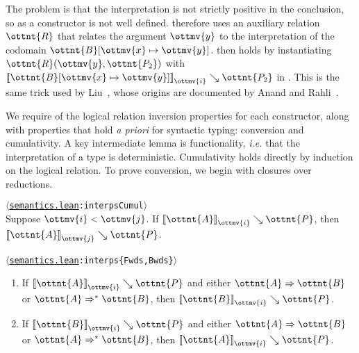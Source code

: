 \documentclass[a4paper,UKenglish,cleveref,autoref,thm-restate]{lipics-v2021}
\makeatletter
\newcommand{\citep}[1]{\cite{#1}}
\newcommand{\repo}{https://github.com/ionathanch/TTBFL}
\newcommand{\ie}{\textit{i.e.}\@\xspace}
\newcommand{\apriori}{\textit{a priori}\@\xspace}
\newcommand{\thmref}[2]{%
  $\langle$\href{\repo/tree/main/src/#1}{\texttt{#1}}\texttt{:#2}$\rangle$%
}
\makeatother
\begin{document}
The problem is that the interpretation is not strictly positive in the conclusion,
so  as a constructor is not well defined.
 therefore uses an auxiliary relation $\ottnt{R}$
that relates the argument $\ottmv{y}$ to the interpretation of the codomain $ \ottnt{B} [  \ottmv{x}  \mapsto  \ottmv{y}  ] $.
 then holds by instantiating $ \ottnt{R} ( \ottmv{y} ,  \ottnt{P_{{\mathrm{2}}}} ) $ with $ \mathopen{\llbracket}   \ottnt{B} [  \ottmv{x}  \mapsto  \ottmv{y}  ]   \mathclose{\rrbracket}_{ \ottmv{i} } \searrow  \ottnt{P_{{\mathrm{2}}}} $ in .
This is the same trick used by Liu~\citep{lr-pearl},
whose origins are documented by Anand and Rahli~\citep{mech-nuprl}.

We require of the logical relation inversion properties for each constructor,
along with properties that hold \apriori for syntactic typing:
conversion and cumulativity.
A key intermediate lemma is functionality,
\ie that the interpretation of a type is deterministic.
Cumulativity holds directly by induction on the logical relation.
To prove conversion, we begin with closures over reductions.

\begin{lemma}[Cumulativity (l.r.)] \thmref{semantics.lean}{interpsCumul} \label{lem:lr:cumul} \\
  Suppose $ \ottmv{i}  <  \ottmv{j} $. If $ \mathopen{\llbracket}  \ottnt{A}  \mathclose{\rrbracket}_{ \ottmv{i} } \searrow  \ottnt{P} $, then $ \mathopen{\llbracket}  \ottnt{A}  \mathclose{\rrbracket}_{ \ottmv{j} } \searrow  \ottnt{P} $.
\end{lemma}

\begin{lemma} \thmref{semantics.lean}{interps\{Fwds,Bwds\}} \label{lem:lr:pars} ~
  \begin{enumerate}[topsep=0pt]
    \item If $ \mathopen{\llbracket}  \ottnt{A}  \mathclose{\rrbracket}_{ \ottmv{i} } \searrow  \ottnt{P} $ and either $ \ottnt{A}  \Rightarrow  \ottnt{B} $ or $ \ottnt{A}  \Rightarrow^\ast  \ottnt{B} $,
      then $ \mathopen{\llbracket}  \ottnt{B}  \mathclose{\rrbracket}_{ \ottmv{i} } \searrow  \ottnt{P} $.
    \item If $ \mathopen{\llbracket}  \ottnt{B}  \mathclose{\rrbracket}_{ \ottmv{i} } \searrow  \ottnt{P} $ and either $ \ottnt{A}  \Rightarrow  \ottnt{B} $ or $ \ottnt{A}  \Rightarrow^\ast  \ottnt{B} $,
      then $ \mathopen{\llbracket}  \ottnt{A}  \mathclose{\rrbracket}_{ \ottmv{i} } \searrow  \ottnt{P} $.
  \end{enumerate}
\end{lemma}
\end{document}
